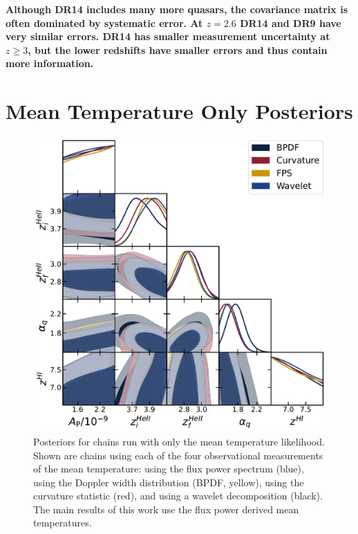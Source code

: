 \textbf{Although DR14 includes many more quasars, the covariance matrix is often dominated by systematic error. At $z=2.6$ DR14 and DR9 have very similar errors. DR14 has smaller measurement uncertainty at $z \geq 3$, but the lower redshifts have smaller errors and thus contain more information.}

\section{Mean Temperature Only Posteriors}\label{sec:t0-only}

\begin{figure}
    \centering
    \includegraphics[width=\textwidth]{figures/datasets_t0_corner.pdf}
    \caption{\label{fig:t0_datasets}
    Posteriors for chains run with only the mean temperature likelihood.
    Shown are chains using each of the four observational measurements of the mean temperature: using the flux power spectrum (blue), using the Doppler width distribution (BPDF, yellow), using the curvature statistic (red), and using a wavelet decomposition (black).
    The main results of this work use the flux power derived mean temperatures.
    }
\end{figure}

